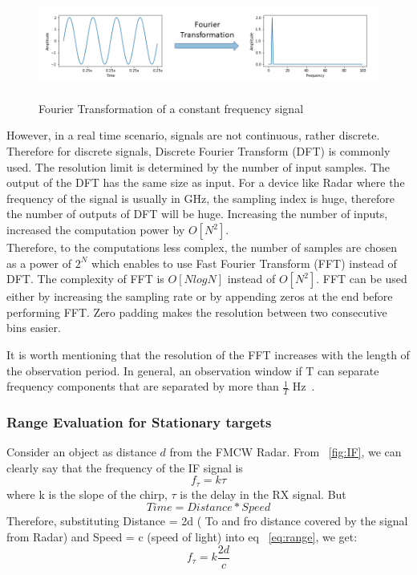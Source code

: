  \begin{figure}[ht]
  \begin{center}
    \includegraphics[width=1\textwidth, height = 3.5cm ]{Master's thesis/images/fft.png} 
    \caption{Fourier Transformation of a constant frequency signal}
    \label{fig:fft}
  \end{center}
\end{figure}  

However, in a real time scenario, signals are not continuous, rather discrete. Therefore for discrete signals, Discrete Fourier Transform (DFT) is commonly used. The resolution limit is determined by the number of input samples.
The output of the DFT has the same size as input. For a device like Radar where the frequency of the signal is usually in GHz, the sampling index is huge, therefore the number of outputs of DFT will be huge. Increasing the number of inputs, increased the computation power by $O[N^2]$.
\\

Therefore, to the computations less complex, the number of samples are chosen as a power of $2^N$ which enables to use Fast Fourier Transform (FFT) instead of DFT. The complexity of FFT is $O[NlogN]$ instead of $O[N^2]$. FFT can be used either by increasing the sampling rate or by appending zeros at the end before performing FFT. Zero padding makes the resolution between two consecutive bins easier.

It is worth mentioning that the resolution of the FFT increases with the length of the observation period. In general, an observation window if T can separate frequency components that are separated by more than $\frac{1}{T}$ Hz~\cite{rao_2017}.


\subsubsection{Range Evaluation for Stationary targets}\label{sec:rangeEval}

Consider an object as distance $d$ from the FMCW Radar. From ~\ref{fig:IF}, we can clearly say that the frequency of the IF signal is 
\begin{equation}\label{eq:range}
    f_{\tau}= k\tau
\end{equation}
where k is the slope of the chirp, $\tau$ is the delay in the RX signal.
But 
\begin{equation}
    Time = Distance*Speed
\end{equation}
Therefore, substituting Distance = 2d ( To and fro distance covered by the signal from Radar) and Speed = c (speed of light) into eq ~\ref{eq:range}, we get:
\begin{equation}\label{eq:range_eq}
f_{\tau}= k\frac{2d}{c}   
\end{equation}


